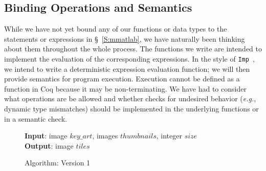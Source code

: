 \documentclass[11pt,conference]{IEEEtran}
\theoremstyle{plain} %
\theoremstyle{definition}
\theoremstyle{remark}
\begin{document}
\subsection{Binding Operations and Semantics}

While we have not yet bound any of our functions or data types to the statements
or expressions in \S~\ref{S:mmatlab}, we have naturally been thinking about them
throughout the whole process. The functions we write are intended to implement
the evaluation of the corresponding expressions. In the style of
\texttt{Imp}~\cite{Pierce:SF1}, we intend to write a deterministic expression
evaluation function; we will then provide semantics for program execution.
Execution cannot be defined as a function in Coq because it may be
non-terminating. We have had to consider what operations are be allowed and
whether checks for undesired behavior (\emph{e.g.}, dynamic type mismatches)
should be implemented in the underlying functions or in a semantic check.



\begin{figure}[!t]
    \textbf{Input}: image \(key\_art\), images \(thumbnails\), integer \(size\) \\
    \textbf{Output}: image \(tiles\)
    \begin{algorithmic}
            \ENDFOR
        \ENDFOR
    \end{algorithmic}
    \caption{Algorithm: Version 1}\label{alg:v1}
\end{figure}
\end{document}
